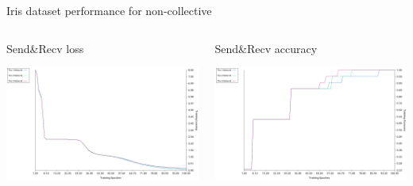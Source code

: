 \documentclass[presentation]{beamer}
\begin{document}
\begin{frame}[label={sec:orgc61dab6}]{Iris dataset performance for non-collective}
\begin{columns}
\begin{column}{0.6\columnwidth}
\begin{block}{Send\&Recv loss}
\begin{center}
\includegraphics[width=.9\linewidth]{./png/iris_sendrecv_loss.png}
\end{center}
\end{block}
\end{column}

\begin{column}{0.6\columnwidth}
\begin{block}{Send\&Recv accuracy}
\begin{center}
\includegraphics[width=.9\linewidth]{./png/iris_sendrecv_accuracy.png}
\end{center}
\end{block}
\end{column}
\end{columns}
\end{frame}
\end{document}
